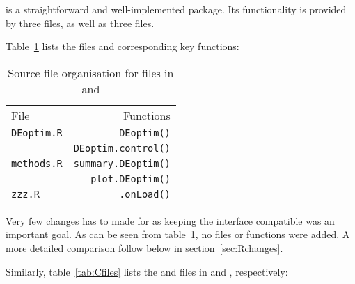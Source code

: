 \documentclass[nojss,shortnames,article]{jss}
\begin{document}
 is a straightforward and well-implemented package. Its
functionality is provided by three  files, as well as three
 files.

Table~\ref{tab:Rfiles} lists the files and corresponding key functions:

\begin{table}[htb]
  \begin{center}
    \begin{tabular}{lr}
      \toprule
      File                                          & Functions \\ 
      \verb|DEoptim.R| \phantom{XXXXXXXXX}        & \verb|DEoptim()| \\
                                                   & \verb|DEoptim.control()| \\[6pt]
      \verb|methods.R|                            & \verb|summary.DEoptim()| \\
                                                   & \verb|plot.DEoptim()| \\[6pt]
      \verb|zzz.R|                                & \verb|.onLoad()| \\
      \bottomrule
    \end{tabular}
    \caption{Source file organisation for  files in 
    and }
    \label{tab:Rfiles}
  \end{center}
\end{table}

Very few changes has to made for  as keeping the interface
compatible was an important goal. As can be seen from table~\ref{tab:Rfiles},
no files or functions were added.  A more detailed comparison follow below
in section~\ref{sec:Rchanges}.

Similarly, table~\ref{tab:Cfiles} lists the  and 
files in  and , respectively:
\end{document}
